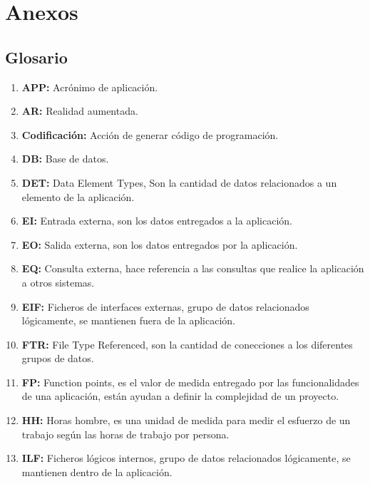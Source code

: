 \section{Anexos}





\subsection{Glosario}



\begin{enumerate}
	\item \textbf{APP:} Acrónimo de aplicación.
	\item \textbf{AR:} Realidad aumentada.
	\item \textbf{Codificación:} Acción de generar código de programación.
	\item \textbf{DB:} Base de datos.
	\item \textbf{DET:} Data Element Types, Son la cantidad de datos relacionados a un elemento de la aplicación.
	\item \textbf{EI:} Entrada externa, son los datos entregados a la aplicación.
	\item \textbf{EO:} Salida externa, son los datos entregados por la aplicación.
	\item \textbf{EQ:} Consulta externa, hace referencia a las consultas que realice la aplicación a otros sistemas.
	\item \textbf{EIF:} Ficheros de interfaces externas, grupo de datos relacionados lógicamente, se mantienen fuera de la aplicación.
	\item \textbf{FTR:} File Type Referenced, son la cantidad de conecciones a los diferentes grupos de datos.
	\item \textbf{FP:} Function points, es el valor de medida entregado por las funcionalidades de una aplicación, están ayudan a definir la complejidad de un proyecto.
	\item \textbf{HH:} Horas hombre, es una unidad de medida para medir el esfuerzo de un trabajo según las horas de trabajo por persona.
	\item \textbf{ILF:} Ficheros lógicos internos, grupo de datos relacionados lógicamente, se mantienen dentro de la aplicación.

\end{enumerate}
